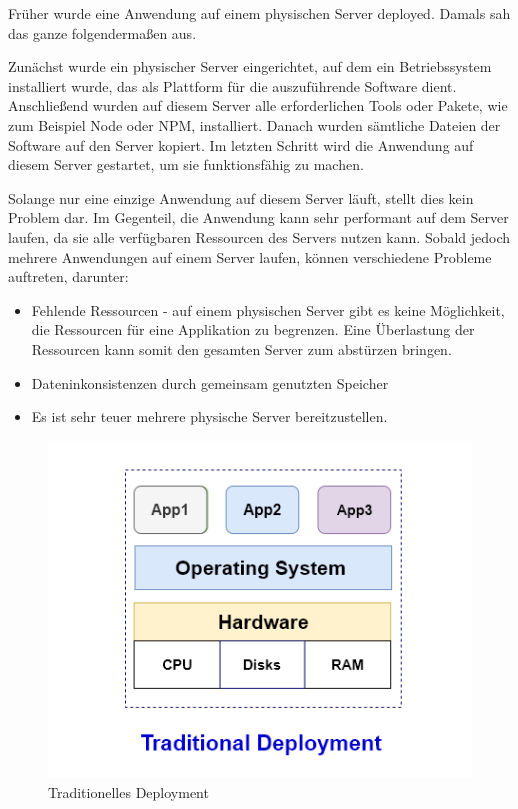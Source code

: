 Früher wurde eine Anwendung auf einem physischen Server deployed. Damals sah das ganze folgendermaßen aus.

Zunächst wurde ein physischer Server eingerichtet, auf dem ein Betriebssystem installiert wurde, das als Plattform für die auszuführende Software dient. Anschließend wurden auf diesem Server alle erforderlichen Tools oder Pakete, wie zum Beispiel Node oder NPM, installiert. Danach wurden sämtliche Dateien der Software auf den Server kopiert. Im letzten Schritt wird die Anwendung auf diesem Server gestartet, um sie funktionsfähig zu machen.


Solange nur eine einzige Anwendung auf diesem Server läuft, stellt dies kein Problem dar. Im Gegenteil, die Anwendung kann sehr performant auf dem Server laufen, da sie alle verfügbaren Ressourcen des Servers nutzen kann. Sobald jedoch mehrere Anwendungen auf einem Server laufen, können verschiedene Probleme auftreten, darunter:

\begin{itemize}
    \item Fehlende Ressourcen - auf einem physischen Server gibt es keine Möglichkeit, die Ressourcen für eine Applikation zu begrenzen. Eine Überlastung der Ressourcen kann somit den gesamten Server zum abstürzen bringen.
    \item Dateninkonsistenzen durch gemeinsam genutzten Speicher
    \item Es ist sehr teuer mehrere physische Server bereitzustellen.
\end{itemize}

\begin{figure}[h]
    \centering
    \includegraphics[width=0.8\linewidth]{pics/traditionelles-deployment.png}
    \caption{Traditionelles Deployment}
    \label{fig:enter-label}
\end{figure}


